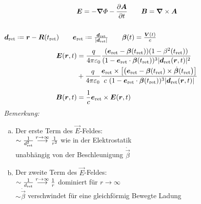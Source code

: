 \begin{equation*}
\bm{E} = - \bm{\nabla} \varPhi - \frac{\partial \bm{A}}{\partial t} \qquad \bm{B} = \bm{\nabla} \times \bm{A}
\end{equation*}
\\
%
%
%
%
%
%
$ \vec{d}_{\tx{ret}} \defeq \vec{r} - \vec{R}(t_{\tx{ret}}) \qquad \vec{e}_{\tx{ret}} \defeq \frac{\vec{d}_{\tx{ret}}}{|\vec{d}_{\tx{ret}}|} \qquad \vec{\beta}(t) = \frac{\vec{V}(t)}{c} $
\begin{align*}
\bm{E}(\bm{r},t) &= \frac{q}{4 \pi \varepsilon_0} \frac{(\bm{e}_{\textrm{ret}} - \bm{\beta}(t_{\textrm{ret}})) ( 1 - \beta^2 (t_{\textrm{ret}}) )}{(1 - \bm{e}_{\textrm{ret}} \cdot \bm{\beta}(t_{\textrm{ret}}))^3 |\bm{d}_{\textrm{ret}}(\bm{r},t)|^2}\\
&+ \frac{q}{4 \pi \varepsilon_0} \frac{\bm{e}_{\textrm{ret}} \times \left[\left(\bm{e}_{\textrm{ret}} - \bm{\beta}(t_{\textrm{ret}}) \times \dot{\bm{\beta}}(t_{\textrm{ret}}\right)\right]}{c \ ( 1 - \bm{e}_{\textrm{ret}} \cdot \bm{\beta}(t_{\textrm{ret}}))^3 |\bm{d}_{\textrm{ret}}(\bm{r},t)|}\\[5pt]
\bm{B}(\bm{r},t) &= \frac{1}{c} \bm{e}_{\textrm{ret}} \times \bm{E}(\bm{r},t)
\end{align*}
\emph{Bemerkung:}
\begin{enumerate}[a)]
	\item Der erste Term des $ \vec{E} $-Feldes:\\
	$ \sim \frac{1}{d_{\textrm{ret}}^2} \overset{r \to \infty}{\longrightarrow} \frac{1}{r^2} $ wie in der Elektrostatik\\
	unabhängig von der Beschleunigung $ \dot{\vec{\beta}} $
	\item Der zweite Term des $ \vec{E} $-Feldes:\\
	$ \sim \frac{1}{d_{\textrm{ret}}} \overset{r \to \infty}{\longrightarrow} \frac{1}{r} $ dominiert für $ r \to \infty $\\[5pt]
	$ \sim \dot{\vec{\beta}} $ verschwindet für eine gleichförmig Bewegte Ladung
\end{enumerate}
